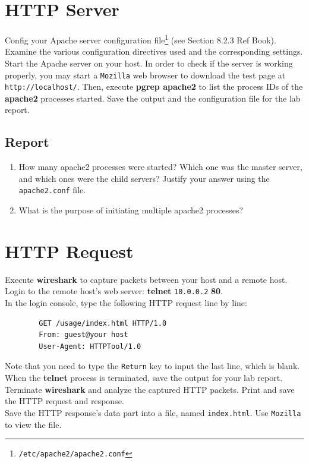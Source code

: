 \documentclass[10pt,a4paper]{article}
\numberwithin{equation}{section}
\numberwithin{figure}{section}
\numberwithin{table}{section}
\begin{document}
    \section{HTTP Server}
    Config your Apache server configuration file\footnote{\texttt{/etc/apache2/apache2.conf}} (see Section 8.2.3 Ref Book).
    Examine the various configuration directives used and the corresponding settings. \\
    Start the Apache server on your host.
    In order to check if the server is working properly, you may start a \texttt{Mozilla} web browser to download the test page at \texttt{http://localhost/}.
    Then, execute \textbf{pgrep apache2} to list the process IDs of the \textbf{apache2} processes started.
    Save the output and the configuration file for the lab report.
    \subsection*{Report}
    \begin{enumerate}
        \item How many apache2 processes were started?
        Which one was the master server, and which ones were the child servers?
        Justify your answer using the \texttt{apache2.conf} file.
        \item What is the purpose of initiating multiple apache2 processes?
    \end{enumerate}

    \section{HTTP Request}
    Execute \textbf{wireshark} to capture packets between your host and a remote host. \\
    Login to the remote host’s web server: \textbf{telnet} \texttt{10.0.0.2} \textbf{80}. \\
    In the login console, type the following HTTP request line by line:
    \begin{verbatim}
        GET /usage/index.html HTTP/1.0
        From: guest@your host
        User-Agent: HTTPTool/1.0
    \end{verbatim}
    Note that you need to type the \texttt{Return} key to input the last line, which is blank.
    When the \textbf{telnet} process is terminated, save the output for your lab report. \\
    Terminate \textbf{wireshark} and analyze the captured HTTP packets.
    Print and save the HTTP request and response. \\
    Save the HTTP response’s data part into a file, named \texttt{index.html}.
    Use \texttt{Mozilla} to view the file.
\end{document}
